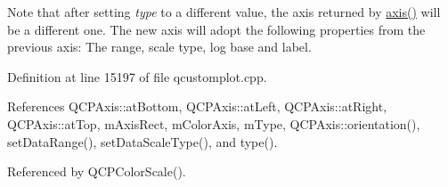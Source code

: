 Note that after setting {\itshape type} to a different value, the axis returned by \hyperlink{class_q_c_p_color_scale_a1205bd67c8a33d5818aac1f6eea016a4}{axis()} will be a different one. The new axis will adopt the following properties from the previous axis\+: The range, scale type, log base and label. 

Definition at line 15197 of file qcustomplot.\+cpp.



References Q\+C\+P\+Axis\+::at\+Bottom, Q\+C\+P\+Axis\+::at\+Left, Q\+C\+P\+Axis\+::at\+Right, Q\+C\+P\+Axis\+::at\+Top, m\+Axis\+Rect, m\+Color\+Axis, m\+Type, Q\+C\+P\+Axis\+::orientation(), set\+Data\+Range(), set\+Data\+Scale\+Type(), and type().



Referenced by Q\+C\+P\+Color\+Scale().



